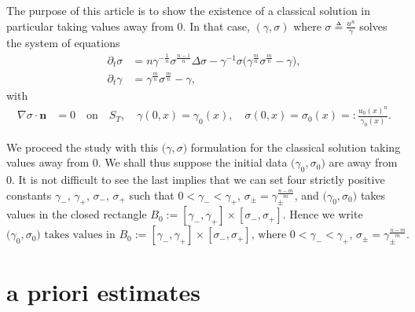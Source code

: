 \documentclass[a4paper,11pt]{article}
\theoremstyle{remark}
\begin{document}
The purpose of this article is to show the existence of a classical solution in particular taking values away from $0$. In that case, $(\gamma,\sigma)$ where $\sigma\triangleq\frac{u^n}{\gamma}$ solves the system of equations
\begin{align}
 \partial_t \sigma &= n\gamma^{-\frac{1}{n}}\sigma^{\frac{n-1}{n}} \Delta \sigma - \gamma^{-1}\sigma\Big(\gamma^{\frac{m}{n}}\sigma^{\frac{m}{n}}-\gamma\Big) \label{eq:s},\\
 \partial_t \gamma &= \gamma^{\frac{m}{n}}\sigma^{\frac{m}{n}} - \gamma, \label{eq:g}
\end{align}
with
\begin{align}
 \nabla\sigma \cdot \mathbf{n} &= 0 \quad \text{on} \quad S_T, \quad \gamma(0,x) = \gamma_0(x), \quad \sigma(0,x)=\sigma_0(x)=:\frac{u_0(x)^n}{\gamma_0(x)}. \label{IBC}
\end{align}


We proceed the study with this $\big(\gamma,\sigma\big)$ formulation for the classical solution taking values away from $0$. We shall thus suppose the initial data $\big(\gamma_0,\sigma_0\big)$ are away from $0$. It is not difficult to see the last implies that we can set four strictly positive constants $\gamma_-$, $\gamma_+$, $\sigma_-$, $\sigma_+$ such that $0<\gamma_-< \gamma_+$, $\sigma_\pm = \gamma_\pm^{\frac{n-m}{m}}$, and $\big(\gamma_0,\sigma_0\big)$ takes values in the closed rectangle $B_0:=[\gamma_-, \gamma_+] \times [\sigma_-, \sigma_+]$. Hence we write
\begin{equation} \label{B0cond}
 \text{$\big(\gamma_0,\sigma_0\big)$ takes values in $B_0:=[\gamma_-, \gamma_+] \times [\sigma_-, \sigma_+]$, where $0<\gamma_-< \gamma_+$, $\sigma_\pm = \gamma_\pm^{\frac{n-m}{m}}$.}
\end{equation}

\section{a priori estimates}
\end{document}
